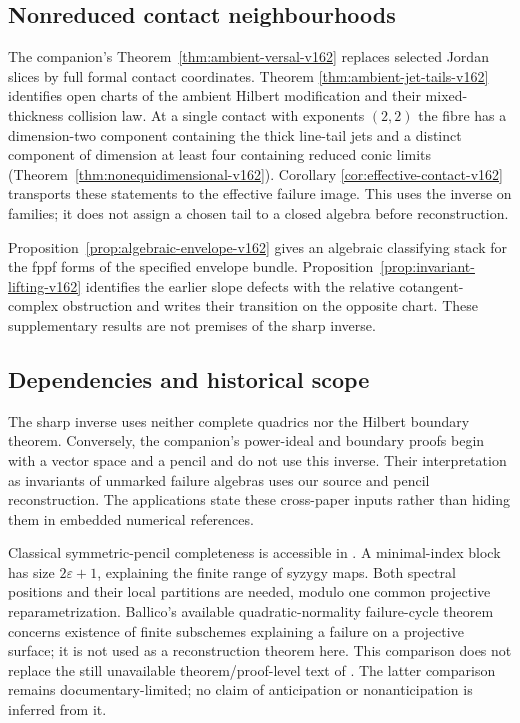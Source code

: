 \subsection{Nonreduced contact neighbourhoods}
The companion's Theorem~\ref{thm:ambient-versal-v162} replaces selected
Jordan slices by full formal contact coordinates. Theorem
\ref{thm:ambient-jet-tails-v162} identifies open charts of the ambient
Hilbert modification and their mixed-thickness collision law. At a
single contact with exponents $(2,2)$ the fibre has a dimension-two
component containing the thick line-tail jets and a distinct component
of dimension at least four containing reduced conic limits
(Theorem~\ref{thm:nonequidimensional-v162}). Corollary
\ref{cor:effective-contact-v162} transports these statements to the
effective failure image. This uses the inverse on families; it does
not assign a chosen tail to a closed algebra before reconstruction.

Proposition~\ref{prop:algebraic-envelope-v162} gives an algebraic
classifying stack for the fppf forms of the specified envelope bundle.
Proposition~\ref{prop:invariant-lifting-v162} identifies the earlier
slope defects with the relative cotangent-complex obstruction and
writes their transition on the opposite chart. These supplementary
results are not premises of the sharp inverse.

\subsection{Dependencies and historical scope}
The sharp inverse uses neither complete quadrics nor the Hilbert
boundary theorem. Conversely, the companion's power-ideal and
boundary proofs begin with a vector space and a pencil and do not
use this inverse. Their interpretation as invariants of unmarked
failure algebras uses our source and pencil reconstruction. The
applications state these cross-paper inputs rather than hiding them
in embedded numerical references.

Classical symmetric-pencil completeness is accessible in
\cite[Theorem~2.1]{DeTeranDmytryshynDopico2018v161}. A minimal-index
block has size $2\varepsilon+1$, explaining the finite range of
syzygy maps. Both spectral positions and their local partitions are
needed, modulo one common projective reparametrization.
Ballico's available quadratic-normality failure-cycle theorem
\cite[Theorem~0.2]{Ballico1996v161} concerns existence of finite
subschemes explaining a failure on a projective surface; it is not
used as a reconstruction theorem here. This comparison does not
replace the still unavailable theorem/proof-level text of
\cite{Ballico93}. The latter comparison remains documentary-limited;
no claim of anticipation or nonanticipation is inferred from it.

